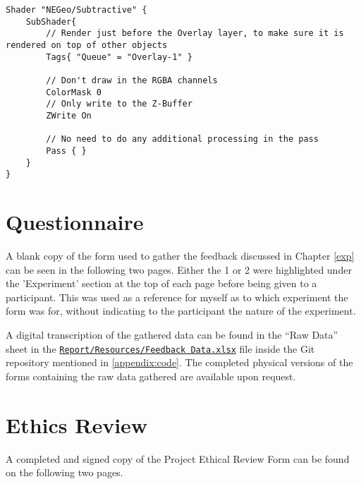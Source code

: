 		\begin{lstlisting}[caption="Render Cull Shader - Subtractive.shader", label=appendix:code:shader]
Shader "NEGeo/Subtractive" {
	SubShader{
		// Render just before the Overlay layer, to make sure it is rendered on top of other objects
		Tags{ "Queue" = "Overlay-1" }

		// Don't draw in the RGBA channels
		ColorMask 0
		// Only write to the Z-Buffer
		ZWrite On

		// No need to do any additional processing in the pass
		Pass { }
	}
}
		\end{lstlisting}

	\section{Questionnaire}
	\label{appendix:question}
		A blank copy of the form used to gather the feedback discussed in Chapter \ref{exp} can be seen in the following two pages. Either the 1 or 2 were highlighted under the 'Experiment' section at the top of each page before being given to a participant. This was used as a reference for myself as to which experiment the form was for, without indicating to the participant the nature of the experiment.

		A digital transcription of the gathered data can be found in the \enquote{Raw Data} sheet in the \href{https://github.com/nboxhallburnett/IndividualProject/blob/master/Report/Resources/Feedback\%20Data.xlsx?raw=true}{\texttt{Report/Resources/Feedback Data.xlsx}} file inside the Git repository mentioned in \autoref{appendix:code}.
		The completed physical versions of the forms containing the raw data gathered are available upon request.

		

	\section{Ethics Review}
	\label{appendix:ethics}
		A completed and signed copy of the Project Ethical Review Form can be found on the following two pages.

		
